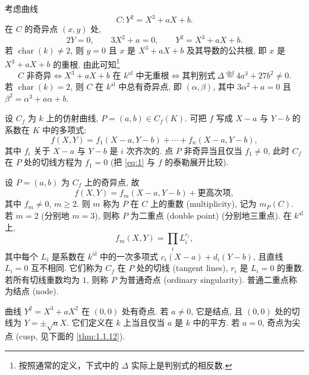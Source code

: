 \begin{example} \label{thm:1.1.5} 
考虑曲线
\[
C\colon Y^2 = X^3 + aX + b.
\]
在 $C$ 的奇异点 $(x,y)$ 处,
\[
2Y = 0, \qquad 3X^2 + a = 0, \qquad Y^2 = X^3 + aX + b.
\]
若 $\operatorname{char}(k)\neq 2$, 则 $y = 0$ 且 $x$ 是 $X^3+aX+b$ 及其导数的公共根, 即 $x$ 是 $X^3+aX+b$ 的重根. 由此可知\footnote{按照通常的定义，下式中的 $\Delta$ 实际上是判别式的相反数.}
\[
C \text{ 非奇异} \iff X^3+aX+b \text{ 在 } k^{\mathrm{al}} \text{ 中无重根} \iff \text{其判别式}\ \Delta \overset{\text{def}}{=} 4a^3 + 27b^2 \neq 0.
\]
若 $\operatorname{char}(k) = 2$, 则 $C$ 在 $k^{\mathrm{al}}$ 中总有奇异点, 即 $(\alpha,\beta)$, 其中 $3\alpha^2 + a = 0$ 且 $\beta^2 = \alpha^3 + a\alpha + b$.

\end{example}

设 $C_f$ 为 $k$ 上的仿射曲线, $P = (a,b)\in C_f(K)$. 可把 $f$ 写成 $X-a$ 与 $Y-b$ 的系数在 $K$ 中的多项式:
\begin{equation} \label{eq:1}
f(X,Y) = f_1(X-a, Y-b) + \cdots + f_n(X-a, Y-b),
\tag{1}
\end{equation}
其中 $f_i$ 关于 $X-a$ 与 $Y-b$ 是 $i$ 次齐次的. 点 $P$ 非奇异当且仅当 $f_1\neq 0$, 此时 $C_f$ 在 $P$ 处的切线方程为 $f_1 = 0$ (把 \eqref{eq:1} 与 $f$ 的泰勒展开比较).

设 $P = (a,b)$ 为 $C_f$ 上的奇异点, 故
\[
f(X,Y) = f_m(X-a, Y-b) + \text{更高次项},
\]
其中 $f_m\neq 0$, $m\ge 2$. 则 $m$ 称为 $P$ 在 $C$ 上的重数 (multiplicity), 记为 $m_P(C)$. 若 $m = 2$ (分别地 $m = 3$), 则称 $P$ 为二重点 (double point) (分别地三重点). 在 $k^{\mathrm{al}}$ 上,
\[
f_m(X,Y) = \prod_i L_i^{r_i},
\]
其中每个 $L_i$ 是系数在 $k^{\mathrm{al}}$ 中的一次多项式 $c_i(X-a) + d_i(Y-b)$, 且直线 $L_i = 0$ 互不相同. 它们称为 $C_f$ 在 $P$ 处的切线 (tangent lines), $r_i$ 是 $L_i = 0$ 的重数. 若所有切线重数均为 $1$, 则称 $P$ 为普通奇点 (ordinary singularity). 普通二重点称为结点 (node).

\begin{example} \label{thm:1.1.6} 
曲线 $Y^2 = X^3 + aX^2$ 在 $(0,0)$ 处有奇点. 若 $a\neq 0$, 它是结点, 且 $(0,0)$ 处的切线为 $Y = \pm\sqrt{a}X$. 它们定义在 $k$ 上当且仅当 $a$ 是 $k$ 中的平方. 若 $a = 0$, 奇点为尖点 (cusp, 见下面的 \ref{thm:1.1.12}).
\end{example}

